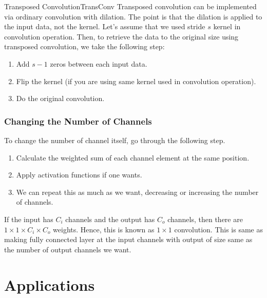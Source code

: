 \documentclass{article}
\begin{document}
            \begin{rem}{Transposed Convolution}{TransConv}
                Transposed convolution can be implemented via ordinary convolution with dilation. The point is that the dilation is applied to the input data, not the kernel.
                Let's assume that we used stride $s$ kernel in convolution operation. Then, to retrieve the data to the original size using transposed convolution,
                we take the following step:
                \begin{enumerate}
                    \item Add $s-1$ zeros between each input data.
                    \item Flip the kernel (if you are using same kernel used in convolution operation).
                    \item Do the original convolution.
                \end{enumerate}
            \end{rem}
        \subsubsection{Changing the Number of Channels}
            To change the number of channel itself, go through the following step. 
            \begin{enumerate}
                \item Calculate the weighted sum of each channel element at the same position.
                \item Apply activation functions if one wants.
                \item We can repeat this as much as we want, decreasing or increasing the number of channels.
            \end{enumerate}
            If the input has $C_i$ channels and the output has $C_o$ channels, then there are $1 \times 1 \times C_i \times C_o$ weights.
            Hence, this is known as $1\times1$ convolution.
            This is same as making fully connected layer at the input channels with output of size same as the number of output channels we want.

\newpage
\section{Applications}
\end{document}
